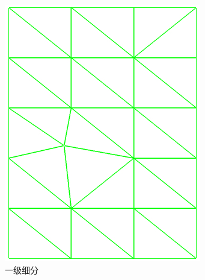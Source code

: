 \begin{figure}
\begin{fullwidth}
\begin{subfigure}[b]{0.245\thewidth}
		\includegraphics[width=1.\textwidth]{figures/r/hierarchical-triangulation-2}
		\caption{一级细分}
	\end{subfigure}
	\begin{subfigure}[b]{0.245\thewidth}

\end{subfigure}
\end{fullwidth}
\end{figure}
